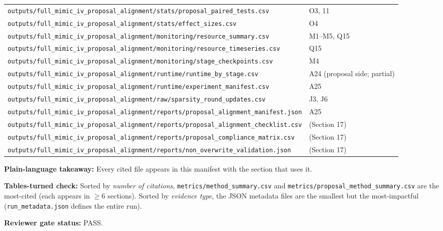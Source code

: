 \documentclass{article}
\begin{document}
\begin{table}[H]
{\begin{tabular}{ll}
    \texttt{outputs/full\_mimic\_iv\_proposal\_alignment/stats/proposal\_paired\_tests.csv} & O3, 11 \\
    \texttt{outputs/full\_mimic\_iv\_proposal\_alignment/stats/effect\_sizes.csv} & O4 \\
    \texttt{outputs/full\_mimic\_iv\_proposal\_alignment/monitoring/resource\_summary.csv} & M1--M5, Q15 \\
    \texttt{outputs/full\_mimic\_iv\_proposal\_alignment/monitoring/resource\_timeseries.csv} & Q15 \\
    \texttt{outputs/full\_mimic\_iv\_proposal\_alignment/monitoring/stage\_checkpoints.csv} & M4 \\
    \texttt{outputs/full\_mimic\_iv\_proposal\_alignment/runtime/runtime\_by\_stage.csv} & A24 (proposal side; partial) \\
    \texttt{outputs/full\_mimic\_iv\_proposal\_alignment/runtime/experiment\_manifest.csv} & A25 \\
    \texttt{outputs/full\_mimic\_iv\_proposal\_alignment/raw/sparsity\_round\_updates.csv} & J3, J6 \\
    \texttt{outputs/full\_mimic\_iv\_proposal\_alignment/reports/proposal\_alignment\_manifest.json} & A25 \\
    \texttt{outputs/full\_mimic\_iv\_proposal\_alignment/reports/proposal\_alignment\_checklist.csv} & (Section 17) \\
    \texttt{outputs/full\_mimic\_iv\_proposal\_alignment/reports/proposal\_compliance\_matrix.csv} & (Section 17) \\
    \texttt{outputs/full\_mimic\_iv\_proposal\_alignment/reports/non\_overwrite\_validation.json} & (Section 17) \\
    \bottomrule
  \end{tabular}
  }
\end{table}


\textbf{Plain-language takeaway:} Every cited file appears in this manifest with the section that uses it.


\textbf{Tables-turned check:} Sorted by \emph{number of citations}, \texttt{metrics/method\_summary.csv} and \texttt{metrics/proposal\_method\_summary.csv} are the most-cited (each appears in \ensuremath{\geq}6 sections). Sorted by \emph{evidence type}, the JSON metadata files are the smallest but the most-impactful (\texttt{run\_metadata.json} defines the entire run).


\textbf{Reviewer gate status:} PASS.
\end{document}
